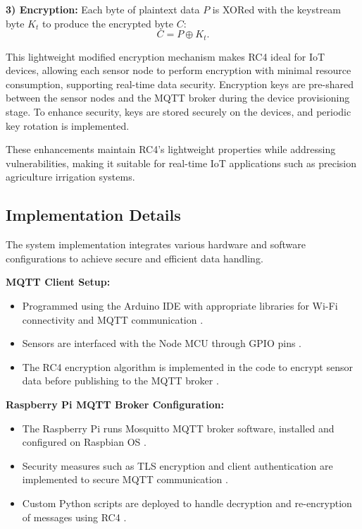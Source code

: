 \documentclass[runningheads]{llncs}
\begin{document}
\textbf{3) Encryption:} Each byte of plaintext data \( P \) is XORed with the keystream byte \( K_t \) to produce the encrypted byte \( C \):
\begin{equation}
C = P \oplus K_t.
\end{equation}

This lightweight modified encryption mechanism makes RC4 ideal for IoT devices, allowing each sensor node to perform encryption with minimal resource consumption, supporting real-time data security. Encryption keys are pre-shared between the sensor nodes and the MQTT broker during the device provisioning stage. To enhance security, keys are stored securely on the devices, and periodic key rotation is implemented.

These enhancements maintain RC4's lightweight properties while addressing vulnerabilities, making it suitable for real-time IoT applications such as precision agriculture irrigation systems.

\subsection{Implementation Details}

The system implementation integrates various hardware and software configurations to achieve secure and efficient data handling.

\textbf{MQTT Client Setup:}
\begin{itemize}
    \item Programmed using the Arduino IDE with appropriate libraries for Wi-Fi connectivity and MQTT communication \cite{ref13}.
    \item Sensors are interfaced with the Node MCU through GPIO pins \cite{ref1}.
    \item The RC4 encryption algorithm is implemented in the code to encrypt sensor data before publishing to the MQTT broker \cite{ref10}.
\end{itemize}

\textbf{Raspberry Pi MQTT Broker Configuration:}
\begin{itemize}
    \item The Raspberry Pi runs Mosquitto MQTT broker software, installed and configured on Raspbian OS \cite{ref17}.
    \item Security measures such as TLS encryption and client authentication are implemented to secure MQTT communication \cite{ref13}.
    \item Custom Python scripts are deployed to handle decryption and re-encryption of messages using RC4 \cite{ref10}.
\end{itemize}
\end{document}
